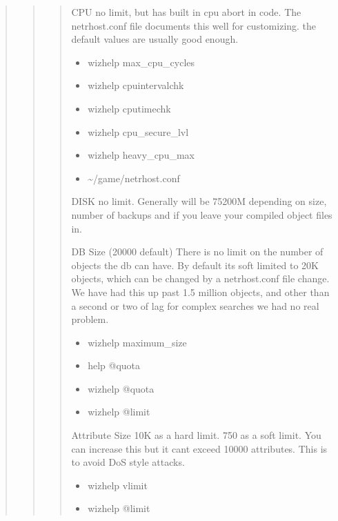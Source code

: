 \documentclass[letterpaper,10pt,english]{sphinxmanual}
\begin{document}
\begin{quote}
\begin{quote}
\begin{quote}
\sphinxAtStartPar
CPU  \sphinxhyphen{} no limit, but has built in cpu abort in code.  The netrhost.conf file documents this well for customizing.  the default values are usually good enough.
\begin{itemize}
\item {} 
\sphinxAtStartPar
wizhelp max\_cpu\_cycles

\item {} 
\sphinxAtStartPar
wizhelp cpuintervalchk

\item {} 
\sphinxAtStartPar
wizhelp cputimechk

\item {} 
\sphinxAtStartPar
wizhelp cpu\_secure\_lvl

\item {} 
\sphinxAtStartPar
wizhelp heavy\_cpu\_max

\item {} 
\sphinxAtStartPar
\textasciitilde{}/game/netrhost.conf

\end{itemize}

\sphinxAtStartPar
DISK \sphinxhyphen{} no limit.  Generally will be 75\sphinxhyphen{}200M depending on size, number of backups and if you leave your compiled object files in.

\sphinxAtStartPar
DB Size \sphinxhyphen{} (20000 default) There is no limit on the number of objects the db can have.  By default it\textquotesingle{}s soft limited to 20K objects, which can be changed by a netrhost.conf file change.  We have had this up past 1.5 million objects, and other than a second or two of lag for complex searches we had no real problem.
\begin{itemize}
\item {} 
\sphinxAtStartPar
wizhelp maximum\_size

\item {} 
\sphinxAtStartPar
help @quota

\item {} 
\sphinxAtStartPar
wizhelp @quota

\item {} 
\sphinxAtStartPar
wizhelp @limit

\end{itemize}

\sphinxAtStartPar
Attribute Size \sphinxhyphen{} 10K as a hard limit.  750 as a soft limit.  You can increase this but it can\textquotesingle{}t exceed 10000 attributes.  This is to avoid DoS style attacks.
\begin{itemize}
\item {} 
\sphinxAtStartPar
wizhelp vlimit

\item {} 
\sphinxAtStartPar
wizhelp @limit

\end{itemize}
\end{quote}
\end{quote}
\end{quote}
\end{document}
